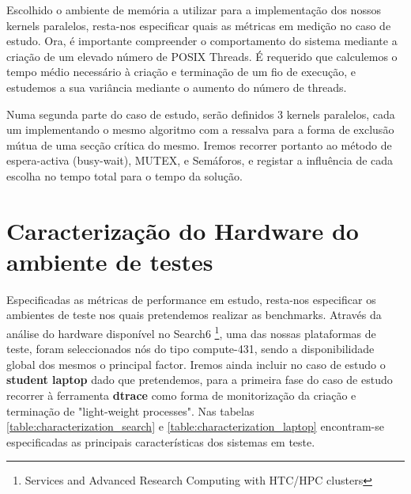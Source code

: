 \documentclass[conference,compsoc]{IEEEtran}
\begin{document}
Escolhido o ambiente de memória a utilizar para a implementação dos nossos kernels paralelos, resta-nos especificar quais as métricas em medição no caso de estudo. Ora, é importante compreender o comportamento do sistema mediante a criação de um elevado número de POSIX Threads. É requerido que calculemos o tempo médio necessário à criação e terminação de um fio de execução, e estudemos a sua variância mediante o aumento do número de threads.\par Numa segunda parte do caso de estudo, serão definidos 3 kernels paralelos, cada um implementando o mesmo algoritmo com a ressalva para a forma de exclusão mútua de uma secção crítica do mesmo. Iremos recorrer portanto ao método de espera-activa (busy-wait), MUTEX, e Semáforos, e registar a influência de cada escolha no tempo total para o tempo da solução. 

\section{Caracterização do Hardware do ambiente de testes}
Especificadas as métricas de performance em estudo, resta-nos especificar os ambientes de teste nos quais pretendemos realizar as benchmarks. Através da análise do hardware disponível no Search6 \footnote{Services and Advanced Research Computing with HTC/HPC clusters}, uma das nossas plataformas de teste, foram seleccionados nós do tipo compute-431, sendo a disponibilidade global dos mesmos o principal factor. Iremos ainda incluir no caso de estudo o \textbf{student laptop} dado que pretendemos, para a primeira fase do caso de estudo recorrer à ferramenta \textbf{dtrace} como forma de monitorização da criação e terminação de "light-weight processes". Nas tabelas \ref{table:characterization_search} e \ref{table:characterization_laptop} encontram-se especificadas as principais características dos sistemas em teste.\par 
\end{document}
